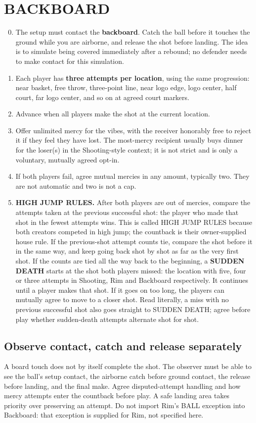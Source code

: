 \documentclass[11pt]{article}
\begin{document}
\section{BACKBOARD}
\begin{enumerate}[start=0]
\setcounter{enumi}{-1}
\item The setup must contact the \textbf{backboard}. Catch the ball before it
touches the ground while you are airborne, and release the shot before landing.
The idea is to simulate being covered immediately after a rebound; no defender
needs to make contact for this simulation.
\item Each player has \textbf{three attempts per location}, using the same
progression: near basket, free throw, three-point line, near logo edge, logo
center, half court, far logo center, and so on at agreed court markers.
\item Advance when all players make the shot at the current location.
\item Offer unlimited mercy for the vibes, with the receiver honorably free to
reject it if they feel they have lost. The most-mercy recipient usually buys
dinner for the loser(s) in the Shooting-style context; it is not strict and is
only a voluntary, mutually agreed opt-in.
\item If both players fail, agree mutual mercies in any amount, typically two.
They are not automatic and two is not a cap.
\item \textbf{HIGH JUMP RULES.} After both players are out of mercies, compare
the attempts taken at the previous successful shot: the player who made that
shot in the fewest attempts wins. This is called HIGH JUMP RULES because both
creators competed in high jump; the countback is their owner-supplied house rule.
If the previous-shot attempt counts tie, compare the shot before it in the same
way, and keep going back shot by shot as far as the very first shot. If the
counts are tied all the way back to the beginning, a \textbf{SUDDEN DEATH} starts
at the shot both players missed: the location with five, four or three attempts
in Shooting, Rim and Backboard respectively. It continues until a player makes
that shot. If it goes on too long, the players can mutually agree to move to a
closer shot. Read literally, a miss with no previous successful shot also goes
straight to SUDDEN DEATH; agree before play whether sudden-death attempts
alternate shot for shot.
\end{enumerate}

\subsection{Observe contact, catch and release separately}
A board touch does not by itself complete the shot. The observer must be able
to see the ball's setup contact, the airborne catch before ground contact, the
release before landing, and the final make. Agree disputed-attempt handling and
how mercy attempts enter the countback before play. A safe landing area takes
priority over preserving an attempt. Do not import Rim's BALL exception into
Backboard: that exception is supplied for Rim, not specified here.
\end{document}

